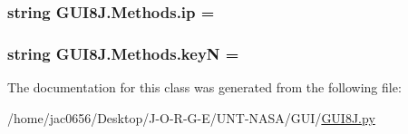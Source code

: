 \subsubsection[{\texorpdfstring{ip}{ip}}]{\setlength{\rightskip}{0pt plus 5cm}string G\+U\+I8\+J.\+Methods.\+ip = \textquotesingle{}\textquotesingle{}\hspace{0.3cm}{\ttfamily [static]}}\hypertarget{classGUI8J_1_1Methods_af8a350aa65fdbdc2a64b36b5e86dca74}{}\label{classGUI8J_1_1Methods_af8a350aa65fdbdc2a64b36b5e86dca74}
\subsubsection[{\texorpdfstring{keyN}{keyN}}]{\setlength{\rightskip}{0pt plus 5cm}string G\+U\+I8\+J.\+Methods.\+keyN = \textquotesingle{}\textquotesingle{}\hspace{0.3cm}{\ttfamily [static]}}\hypertarget{classGUI8J_1_1Methods_a28bf2c3a7818a8c36f162990c504c861}{}\label{classGUI8J_1_1Methods_a28bf2c3a7818a8c36f162990c504c861}


The documentation for this class was generated from the following file\+:\begin{DoxyCompactItemize}
\item 
/home/jac0656/\+Desktop/\+J-\/\+O-\/\+R-\/\+G-\/\+E/\+U\+N\+T-\/\+N\+A\+S\+A/\+G\+U\+I/\hyperlink{GUI8J_8py}{G\+U\+I8\+J.\+py}\end{DoxyCompactItemize}
